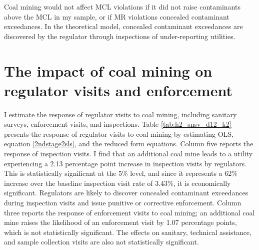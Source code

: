 \documentclass[12pt]{article}
\begin{document}

Coal mining would not affect MCL violations if it did not raise contaminants above the MCL in my sample, or if MR violations concealed contaminant exceedances. In the theoretical model, concealed contaminant exceedances are discovered by the regulator through inspections of under-reporting utilities. 

\section{The impact of coal mining on regulator visits and enforcement}\label{sec:enforcement}

I estimate the response of regulator visits to coal mining, including sanitary surveys, enforcement visits, and inspections. Table \ref{tab:h2_snsv_d12_k2} presents the response of regulator visits to coal mining by estimating OLS, equation \ref{2ndstage2sls}, and the reduced form equations. Column five reports the response of inspection visits. I find that an additional coal mine leads to a utility experiencing a 2.13 percentage point increase in inspection visits by regulators. This is statistically significant at the 5\% level, and since it represents a 62\% increase over the baseline inspection visit rate of 3.43\%, it is economically significant. Regulators are likely to discover concealed contaminant exceedances during inspection visits and issue punitive or corrective enforcement. Column three reports the response of enforcement visits to coal mining; an additional coal mine raises the likelihood of an enforcement visit by 1.07 percentage points, which is not statistically significant. The effects on sanitary, technical assistance, and sample collection visits are also not statistically significant.
\end{document}
